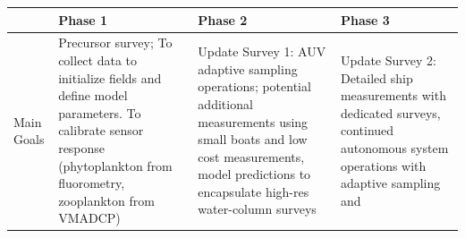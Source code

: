 \begin{table}[H]
  \centering
  \footnotesize{
  \begin{tabular}{|p{4cm}|p{4cm}|p{4cm}|p{4cm}|}\hline 
    \rowcolor{Gray}
    \bfseries  &\bfseries Phase 1 &\bfseries Phase 2 &\bfseries Phase 3 \\
    \hline
    Main Goals& Precursor survey; To collect data to
                initialize fields and define model parameters. To calibrate sensor response (phytoplankton from
                fluorometry, zooplankton from VMADCP)& Update Survey 1:
                                                       AUV adaptive
                                                       sampling
                                                       operations;
                                                       potential
                                                       additional
                                                       measurements
                                                       using small boats
                                                       and low cost
                                                       measurements,
                                                       model predictions
                                                       to encapsulate
                                                       high-res
                                                       water-column surveys& Update Survey 2:
                                                                             Detailed
                                                                             ship
                                                                             measurements
                                                                             with
                                                                             dedicated
                                                                             surveys,
                                                                             continued
                                                                             autonomous system
                                                                             operations
                                                                             with
                                                                             adaptive
                                                                             sampling
                                                                             and

\end{tabular}}
\end{table}
